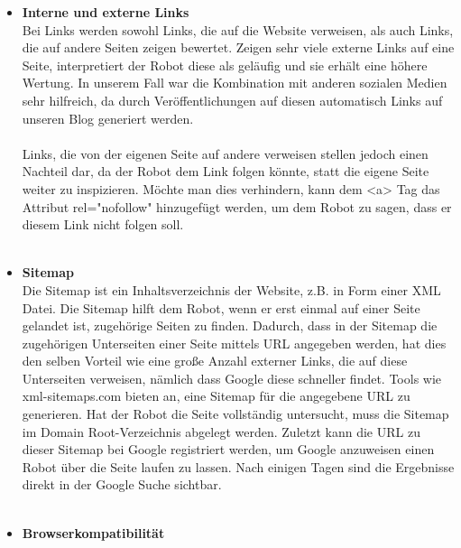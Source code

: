 {\begin{itemize}
        gestaltet werden. Frameworks wie Bootsrap helfen bei diesem Vorhaben, indem mithilfe von vodefinierten CSS-Klassen die Elemente der Website so gestaltet werden, dass diese mit der
        Bilschirmgröße mitwachsen, sich verschieben oder ausgeblendet werden.\\
        \\
      \item \textbf{Interne und externe Links}\\
        Bei Links werden sowohl Links, die auf die Website verweisen, als auch Links, die auf andere Seiten zeigen bewertet.
        Zeigen sehr viele externe Links auf eine Seite, interpretiert der Robot diese als geläufig und sie erhält eine höhere Wertung. In unserem Fall war die Kombination mit anderen sozialen
        Medien sehr hilfreich, da durch Veröffentlichungen auf diesen automatisch Links auf unseren Blog generiert werden.\\
        \\
        Links, die von der eigenen Seite auf andere verweisen stellen jedoch einen Nachteil dar, da der Robot dem Link folgen könnte, statt die eigene Seite weiter zu inspizieren. Möchte man dies
        verhindern, kann dem <a> Tag das Attribut rel="nofollow" hinzugefügt werden, um dem Robot zu sagen, dass er diesem Link nicht folgen soll.\\
        \\
      \item \textbf{Sitemap}\\
      	Die Sitemap ist ein Inhaltsverzeichnis der Website, z.B. in Form einer XML Datei. Die Sitemap hilft dem Robot, wenn er erst einmal auf einer Seite gelandet ist, zugehörige Seiten
        zu finden. Dadurch, dass in der Sitemap die zugehörigen Unterseiten einer Seite mittels URL angegeben werden, hat dies den selben Vorteil wie eine große Anzahl externer Links, die auf diese
        Unterseiten verweisen, nämlich dass Google diese schneller findet. Tools wie xml-sitemaps.com bieten an, eine Sitemap für die angegebene URL zu generieren. Hat der Robot die Seite vollständig
        untersucht, muss die Sitemap im Domain Root-Verzeichnis abgelegt werden. Zuletzt kann die URL zu dieser Sitemap bei Google registriert werden, um Google anzuweisen einen Robot über die Seite
        laufen zu lassen. Nach einigen Tagen sind die Ergebnisse direkt in der Google Suche sichtbar.\\
        \\
      \item \textbf{Browserkompatibilität}\\

\end{itemize}}
